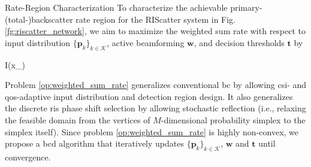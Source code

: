 \documentclass[journal]{IEEEtran}
\begin{document}
\begin{section}{Rate-Region Characterization}
	To characterize the achievable primary-(total-)backscatter rate region for the RIScatter system in Fig. \ref{fg:riscatter_network}, we aim to maximize the weighted sum rate with respect to input distribution $\{\boldsymbol{p}_k\}_{k \in \mathcal{K}}$, active beamforming $\boldsymbol{w}$, and decision thresholds $\boldsymbol{t}$ by
	\begin{maxi!}
		{}{I(x_{})}{\label{op:weighted_sum_rate}}{\label{ob:weighted_sum_rate}}
	\end{maxi!}

	Problem \eqref{op:weighted_sum_rate} generalizes conventional \gls{bc} by allowing \gls{csi}- and \gls{qos}-adaptive input distribution and detection region design.
	It also generalizes the discrete \gls{ris} phase shift selection by allowing stochastic reflection (i.e., relaxing the feasible domain from the vertices of $M$-dimensional probability simplex to the simplex itself).
	Since problem \eqref{op:weighted_sum_rate} is highly non-convex, we propose a \gls{bcd} algorithm that iteratively updates $\{\boldsymbol{p}_k\}_{k \in \mathcal{K}}$, $\boldsymbol{w}$ and $\boldsymbol{t}$ until convergence.


\end{section}
\end{document}
